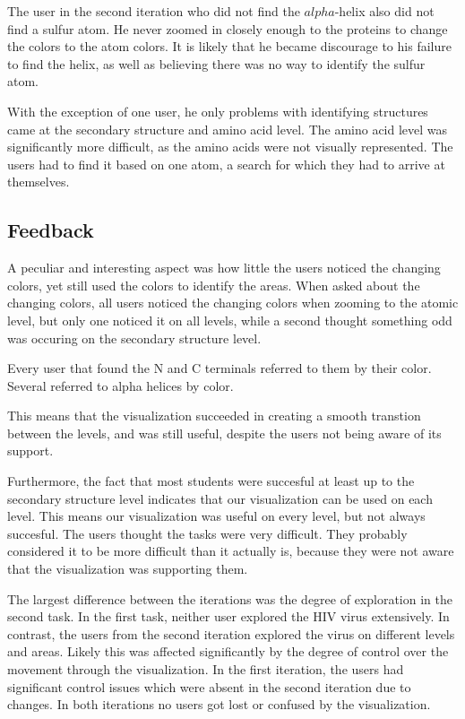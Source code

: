 \documentclass[review,journal]{vgtc}         %
\begin{document}
The user in the second iteration who did not find the $alpha$-helix also did not find a sulfur atom. He never zoomed in closely enough to the proteins to change the colors to the atom colors. It is likely that he became discourage to his failure to find the helix, as well as believing there was no way to identify the sulfur atom.


With the exception of one user, he only problems with identifying structures came at the secondary structure and amino acid level. 
The amino acid level was significantly more difficult, as the amino acids were not visually represented. 
The users had to find it based on one atom, a search for which they had to arrive at themselves. 

\subsection{Feedback}


A peculiar and interesting aspect was how little the users noticed the changing colors, yet still used the colors to identify the areas.
When asked about the changing colors, all users noticed the changing colors when zooming to the atomic level, but only one noticed it on all levels, while a second thought something odd was occuring on the secondary structure level. 
 
Every user that found the N and C terminals referred to them by their color. 
Several referred to alpha helices by color. 

This means that the visualization succeeded in creating a smooth transtion between the levels, and was still useful, despite the users not being aware of its support. 

Furthermore, the fact that most students were succesful at least up to the secondary structure level indicates that our visualization can be used on each level. 
This means our visualization was useful on every level, but not always succesful.
The users thought the tasks were very difficult.
They probably considered it to be more difficult than it actually is, because they were not aware that the visualization was supporting them.

The largest difference between the iterations was the degree of exploration in the second task. In the first task, neither user explored the HIV virus extensively. In contrast, the users from the second iteration explored the virus on different levels and areas. Likely this was affected significantly by the degree of control over the movement through the visualization. In the first iteration, the users had significant control issues which were absent in the second iteration due to changes. In both iterations no users got lost or confused by the visualization.
\end{document}

